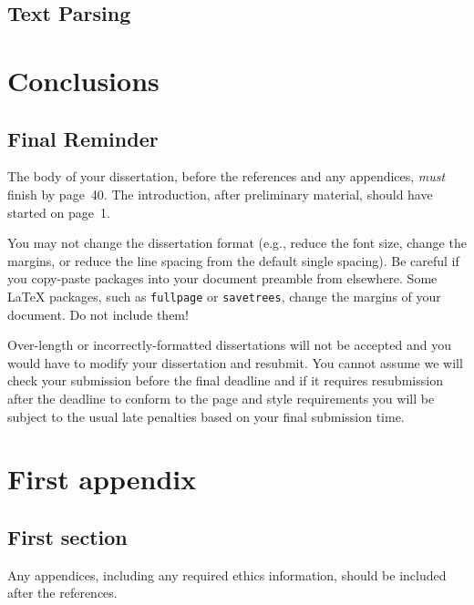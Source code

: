 \documentclass[logo,bsc,singlespacing,parskip]{infthesis}
\theoremstyle{definition}
\begin{document}
\section{Text Parsing}\label{bkg:text-parse}


\chapter{Conclusions}

\section{Final Reminder}

The body of your dissertation, before the references and any appendices,
\emph{must} finish by page~40. The introduction, after preliminary material,
should have started on page~1.

You may not change the dissertation format (e.g., reduce the font size, change
the margins, or reduce the line spacing from the default single spacing). Be
careful if you copy-paste packages into your document preamble from elsewhere.
Some \LaTeX{} packages, such as \texttt{fullpage} or \texttt{savetrees}, change
the margins of your document. Do not include them!

Over-length or incorrectly-formatted dissertations will not be accepted and you
would have to modify your dissertation and resubmit. You cannot assume we will
check your submission before the final deadline and if it requires resubmission
after the deadline to conform to the page and style requirements you will be
subject to the usual late penalties based on your final submission time.

% 
%
%
\printbibliography


\appendix

\chapter{First appendix}

\section{First section}

Any appendices, including any required ethics information, should be included
after the references.
\end{document}
